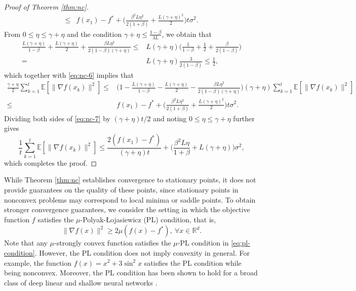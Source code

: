 \documentclass[10pt]{article}
\numberwithin{equation}{section}
\theoremstyle{definition}
\newcommand{\rbb}{\mathbb{R}}  %
\newcommand{\ebb}{\mathbb{E}}  %
\begin{document}
\begin{proof}[Proof of Theorem \ref{thm:nc}]
\begin{equation}
\begin{aligned}
\leq& f(x_1)-f^*+\Big(\frac{\beta^2 L \eta^2}{2(1+\beta)}+\frac{L(\gamma+\eta)^2}{2}\Big) t \sigma^2.
\end{aligned}
\end{equation}
From $0\leq\eta\leq\gamma+\eta$ and the condition $\gamma+\eta \leq \frac{1-\beta}{3 L}$, we obtain that
\begin{equation*}
\begin{aligned}
\frac{L(\gamma+\eta)}{1-\beta}+\frac{L(\gamma+\eta)}{2}+\frac{\beta L \eta^2}{2(1-\beta)(\gamma+\eta)} \leq& L(\gamma+\eta)\Big(\frac{1}{1-\beta}+\frac{1}{2}+\frac{\beta}{2(1-\beta)}\Big) \\
= & L(\gamma+\eta) \frac{3}{2(1-\beta)} \leq \frac{1}{2},
\end{aligned}
\end{equation*}
which together with \eqref{eq:nc-6} implies that
\begin{equation}\label{eq:nc-7}
    \begin{aligned}
        \frac{\gamma+\eta}{2}\sum_{k=1}^t \ebb[\|\nabla f(x_k)\|^2]\leq& \Big(1-\frac{L(\gamma+\eta)}{1-\beta}-\frac{L(\gamma+\eta)}{2}-\frac{\beta L \eta^2}{2(1-\beta)(\gamma+\eta)}\Big)(\gamma+\eta) \sum_{k=1}^t \ebb[\|\nabla f(x_k)\|^2] \\
        \leq& f(x_1)-f^*+\Big(\frac{\beta^2 L \eta^2}{2(1+\beta)}+\frac{L(\gamma+\eta)^2}{2}\Big) t \sigma^2.
    \end{aligned}
\end{equation}
Dividing both sides of \eqref{eq:nc-7} by $(\gamma+\eta)t/2$ and noting $0\leq\eta\leq\gamma+\eta$ further gives
\[
    \frac{1}{t}\sum_{k=1}^t \ebb[\|\nabla f(x_k)\|^2]\leq \frac{2(f(x_1)-f^*)}{(\gamma+\eta)t}+\Big(\frac{\beta^2 L \eta}{1+\beta}+L(\gamma+\eta)\Big)\sigma^2,
\]
which completes the proof.
\end{proof}

While Theorem \ref{thm:nc} establishes convergence to stationary points, it does not provide guarantees on the quality of these points, since stationary points in nonconvex problems may correspond to local minima or saddle points. To obtain stronger convergence guarantees, we consider the setting in which the objective function $f$ satisfies the $\mu$-Polyak-\L{}ojasiewicz (PL) condition, that is, 
\begin{equation}\label{eq:pl-condition}
\| \nabla f(x) \|^2 \ge 2 \mu(f(x)-f^*),~\forall x\in\rbb^d.
\end{equation}
Note that any $\mu$-strongly convex function satisfies the $\mu$-PL condition in \eqref{eq:pl-condition}. However, the PL condition does not imply convexity in general. For example, the function $f(x) = x^2+ 3 \sin^2 x$ satisfies the PL condition while being nonconvex. Moreover, the PL condition has been shown to hold for a broad class of deep linear and shallow neural networks \citep{charles2018stability, hardt2016identity, li2017convergence}.
\end{document}

